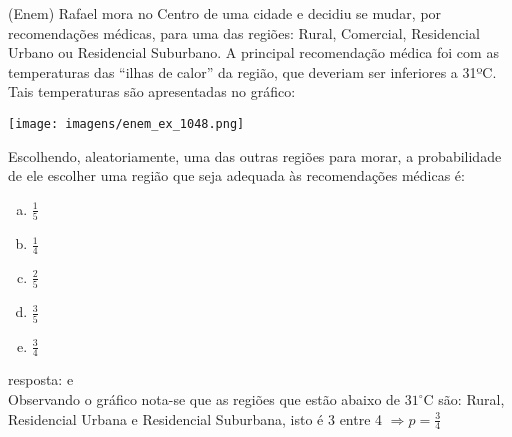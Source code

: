 \begin{ex}
  (Enem) Rafael mora no Centro de uma cidade e decidiu se mudar, por recomendações médicas, para uma das regiões: Rural, Comercial, Residencial Urbano ou Residencial Suburbano. A principal recomendação médica foi com as temperaturas das “ilhas de calor” da região, que deveriam ser inferiores a 31ºC. Tais temperaturas são apresentadas no gráfico: 
     \begin{center}
         \texttt{[image: imagens/enem\_ex\_1048.png]}
     \end{center}
  Escolhendo, aleatoriamente, uma das outras regiões para morar, a probabilidade de ele escolher uma região que seja adequada às recomendações médicas é:
    \begin{enumerate}  [(a)]
        \item $\frac{1}{5}$
        \item $\frac{1}{4}$
        \item $\frac{2}{5}$
        \item $\frac{3}{5}$
        \item $\frac{3}{4}$
    \end{enumerate}
      \begin{sol}
      resposta: e \\
      Observando o gráfico nota-se que as regiões que estão abaixo de $31^{\circ}$C são: Rural, Residencial Urbana e Residencial Suburbana, isto é 3 entre 4 $\Longrightarrow p=\frac{3}{4}$
      \end{sol}
 \end{ex}